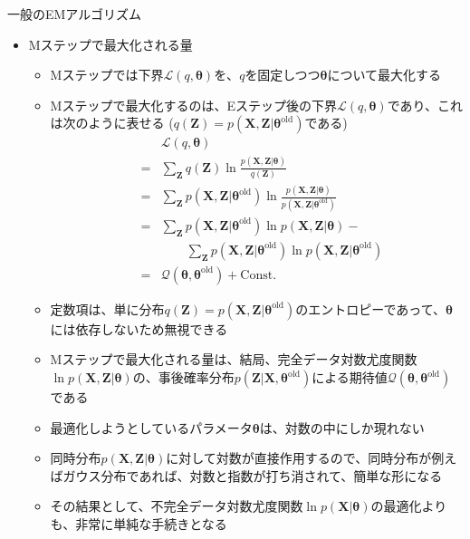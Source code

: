 \documentclass[dvipdfmx,notheorems,t]{beamer}
\begin{document}
\begin{frame}{一般のEMアルゴリズム}

\begin{itemize}
	\item Mステップで最大化される量
	\begin{itemize}
		\item Mステップでは下界$\mathcal{L}(q, \bm{\theta})$を、$q$を固定しつつ$\bm{\theta}$について最大化する
		\item Mステップで最大化するのは、\alert{Eステップ後の下界}$\mathcal{L}(q, \bm{\theta})$であり、これは次のように表せる ($q(\bm{Z}) = p(\bm{X}, \bm{Z} | \bm{\theta}^\mathrm{old})$である)
		\begin{eqnarray}
			&& \mathcal{L}(q, \bm{\theta}) \nonumber \\
			&=& \sum_{\bm{Z}} q(\bm{Z}) \ln \frac{p(\bm{X}, \bm{Z} | \bm{\theta})}{q(\bm{Z})} \nonumber \\
			&=& \sum_{\bm{Z}} p(\bm{X}, \bm{Z} | \bm{\theta}^\mathrm{old}) \ln \frac{p(\bm{X}, \bm{Z} | \bm{\theta})}{p(\bm{X}, \bm{Z} | \bm{\theta}^\mathrm{old})} \\
			&=& \sum_{\bm{Z}} p(\bm{X}, \bm{Z} | \bm{\theta}^\mathrm{old}) \ln p(\bm{X}, \bm{Z} | \bm{\theta}) - \nonumber \\
			&& \qquad \sum_{\bm{Z}} p(\bm{X}, \bm{Z} | \bm{\theta}^\mathrm{old}) \ln p(\bm{X}, \bm{Z} | \bm{\theta}^\mathrm{old}) \\
			&=& \mathcal{Q}(\bm{\theta}, \bm{\theta}^\mathrm{old}) + \mathrm{Const.}
		\end{eqnarray}
		
		\item 定数項は、単に分布$q(\bm{Z}) = p(\bm{X}, \bm{Z} | \bm{\theta}^\mathrm{old})$のエントロピーであって、$\bm{\theta}$には依存しないため無視できる
		\newline
		\item Mステップで最大化される量は、結局、完全データ対数尤度関数$\ln p(\bm{X}, \bm{Z} | \bm{\theta})$の、事後確率分布$p(\bm{Z} | \bm{X}, \bm{\theta}^\mathrm{old})$による期待値\color{red}$\mathcal{Q}(\bm{\theta}, \bm{\theta}^\mathrm{old})$\normalcolor である
		\newline
		\item 最適化しようとしているパラメータ$\bm{\theta}$は、\alert{対数の中にしか現れない}
		\item 同時分布$p(\bm{X}, \bm{Z} | \bm{\theta})$に対して\alert{対数が直接作用}するので、同時分布が例えばガウス分布であれば、対数と指数が打ち消されて、簡単な形になる
		\newline
		\item その結果として、不完全データ対数尤度関数$\ln p(\bm{X} | \bm{\theta})$の最適化よりも、\alert{非常に単純な手続きとなる}
	\end{itemize}
\end{itemize}

\end{frame}
\end{document}
